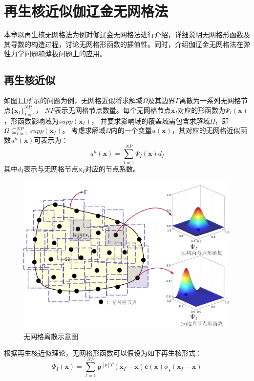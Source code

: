 \chapter{再生核近似伽辽金无网格法}
本章以再生核无网格法为例对伽辽金无网格法进行介绍，详细说明无网格形函数及其导数的构造过程，讨论无网格形函数的插值性。同时，介绍伽辽金无网格法在弹性力学问题和薄板问题上的应用。
\section{再生核近似}
如图\ref{nomeshpoint}所示的问题为例，无网格近似将求解域$\Omega$及其边界$\Gamma$离散为一系列无网格节点$\{\pmb{x}_I\}^{N\!P}_{I=1}$，
$N\!P$表示无网格节点数量。每个无网格节点$\pmb{x}_I$对应的形函数为$\Psi_I(\pmb{x})$，形函数影响域为$supp(\pmb{x}_I)$，
并要求影响域的覆盖域需包含求解域$\Omega$，即$\Omega\subseteq^{N\!P}_{I=1}supp(\pmb{x}_I)$。
考虑求解域$\Omega$内的一个变量$u(\pmb{x})$，其对应的无网格近似函数$u^h(\pmb{x})$可表示为：
\begin{equation}\label{ui}
    u^h(\pmb{x})=\sum_{I=1}^{N\!P}\Psi_I(\pmb{x})d_{I}
\end{equation}
其中$d_{I}$表示与无网格节点$\pmb{x}_I$对应的节点系数。\par
\begin{figure}[H]
\centering
    \includegraphics[scale=0.6]{Figure/nomesh/point.png}
    \caption{无网格离散示意图}\label{nomeshpoint}
\end{figure}\par
根据再生核近似理论\cite{liu1995}，无网格形函数可以假设为如下再生核形式：
\begin{equation}\label{shapefunction}
        \Psi_I(\pmb{x})=\sum_{I=1}^{N\!P}\pmb{p}^{[p]T}(\pmb{x}_I-\pmb{x})\pmb{c}(\pmb{x})\phi_s(\pmb{x}_I-\pmb{x})
\end{equation}
